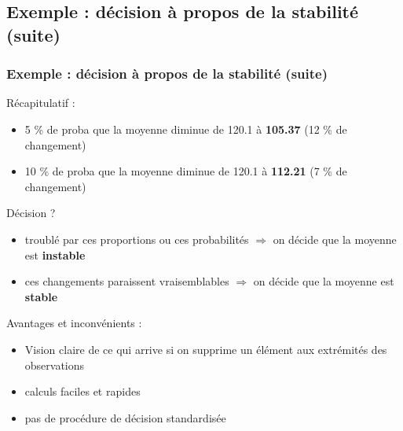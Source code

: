 \documentclass[handout]{beamer}
\begin{document}
		\subsection{Exemple : décision à propos de la stabilité (suite)}
		\begin{frame}
			\frametitle{Exemple : décision à propos de la stabilité (suite)}
			Récapitulatif :
			\begin{itemize}
				\item 5 \% de proba que la moyenne diminue de 120.1 à \textbf{105.37} (12 \% de changement)
				\item 10 \% de proba que la moyenne diminue de 120.1 à \textbf{112.21} (7 \% de changement)
			\end{itemize}

			\vspace{5px}
			Décision ?
			\begin{itemize}
				\item troublé par ces proportions ou ces probabilités $\Rightarrow$ on décide que la moyenne est \textbf{instable}
				\item ces changements paraissent vraisemblables $\Rightarrow$ on décide que la moyenne est \textbf{stable}
			\end{itemize}

			\vspace{5px}
			Avantages et inconvénients :
			\begin{itemize}
				\item Vision claire de ce qui arrive si on supprime un élément aux extrémités des observations
				\item calculs faciles et rapides
				\item pas de procédure de décision standardisée
			\end{itemize}
		\end{frame}
\end{document}
